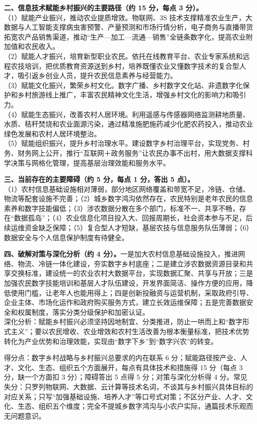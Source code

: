 \documentclass[a4paper,11pt]{article}
\begin{document}
\textbf{二、信息技术赋能乡村振兴的主要路径（约 15 分，每点 3 分）。}\\
（1）赋能产业振兴，推动农业提质增效。物联网、3S 技术支撑精准农业生产，大数据与人工智能支撑病虫害预警、产量预测和市场行情分析，电子商务与直播带货拓宽农产品销售渠道，推动“生产—加工—流通—销售”全链条数字化，提高农业附加值和农民收入。\\
（2）赋能人才振兴，培育新型职业农民。依托在线教育平台、农业专家系统和远程农技培训，把优质教育资源送到乡村，培养既懂农业又懂数字技术的复合型人才，吸引返乡创业人员，提升农民信息素养与经营能力。\\
（3）赋能文化振兴，繁荣乡村文化。数字广播、乡村数字文化站、非遗数字化保护和乡村旅游线上推广，丰富农民精神文化生活，增强乡村文化的影响力和吸引力。\\
（4）赋能生态振兴，改善农村人居环境。利用遥感与传感器网络监测耕地质量、水质、秸秆焚烧和农业面源污染，通过精准施肥施药减少化肥农药投入，推动农业绿色发展和农村人居环境整治。\\
（5）赋能组织振兴，提升乡村治理水平。建设数字乡村治理平台，实现党务、村务、财务网上公开，推行“互联网＋政务服务”让农民办事不出村，用大数据支撑科学决策与网格化管理，提高基层治理效能和服务水平。

\textbf{三、当前存在的主要障碍（约 5 分，每点 1 分，答出 5 点）。}\\
（1）农村信息基础设施相对薄弱，部分地区网络覆盖和带宽不足，冷链、仓储、物流等配套设施不完善；（2）城乡数字鸿沟依然存在，农民特别是老年农民的信息素养和数字技能偏低；（3）涉农数据分散在多个部门，标准不一、共享不畅，存在“数据孤岛”；（4）农业信息化项目投入大、回报周期长，社会资本参与不足，后续运维资金缺乏保障；（5）复合型人才短缺，基层农技与信息服务队伍薄弱；（6）数据安全与个人信息保护制度有待健全。

\textbf{四、破解对策与深化分析（约 4 分）。}一是加大农村信息基础设施投入，推进网络、物流、冷链一体化建设，夯实数字乡村底座；二是建立涉农数据资源目录和共享交换标准，建设统一的农业农村大数据平台，实现数据汇聚、共享与开放；三是加强农民数字技能培训和基层人才队伍建设，开发界面简洁、操作方便的应用，降低使用门槛，让老年人也能用得上；四是创新投融资与运营机制，采取政府引导、企业主体、市场化运作和政府购买服务方式，建立长效运维保障；五是完善数据安全和权属制度，落实分类分级保护和加密认证。\\
深化分析：赋能乡村振兴必须坚持因地制宜、分类推进，防止一哄而上和“数字形式主义”；要以农民增收、农业增效和农村生活改善为根本衡量标准，把技术优势转化为产业优势和治理效能，实现由“数字下乡”到“数字兴农”的转变。

\begin{analysis}得分点：数字乡村战略与乡村振兴总要求的内在联系 6 分；赋能路径按产业、人才、文化、生态、组织五个方面展开，每点有具体技术和措施得 15 分（每点 3 分，缺一个方面扣 3 分）；障碍答出 5 点得 5 分；对策与深化分析得 4 分。常见失分：只罗列物联网、大数据、云计算等技术名词，不谈其与乡村振兴具体目标的对应关系；只写“加强基础设施、培养人才”等口号式对策；不区分产业、人才、文化、生态、组织五个维度；完全不提城乡数字鸿沟与小农户实际，通篇技术乐观而无问题意识。\end{analysis}
\end{document}
